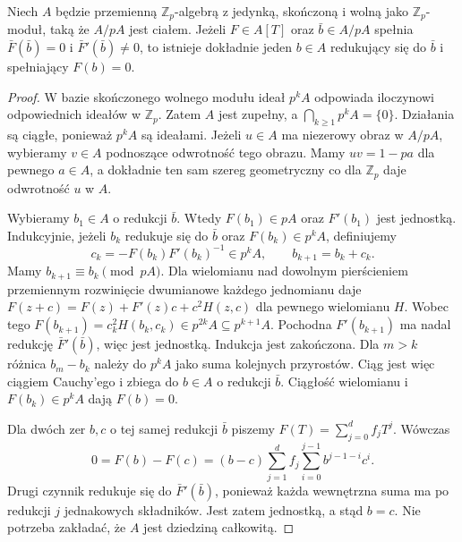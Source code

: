 \begin{lemat}
\label{aa:lem:hensel-simple}
Niech $A$ będzie przemienną $\mathbb Z_p$-algebrą z jedynką,
skończoną i wolną jako $\mathbb Z_p$-moduł, taką że $A/pA$
jest ciałem. Jeżeli $F\in A[T]$ oraz $\bar b\in A/pA$
spełnia $\bar F(\bar b)=0$ i $\bar F'(\bar b)\ne0$, to
istnieje dokładnie jeden $b\in A$ redukujący się do $\bar b$
i spełniający $F(b)=0$.
\end{lemat}
\begin{proof}
W bazie skończonego wolnego modułu ideał $p^kA$ odpowiada
iloczynowi odpowiednich ideałów w $\mathbb Z_p$.
Zatem $A$ jest zupełny, a $\bigcap_{k\ge1}p^kA=\{0\}$.
Działania są ciągłe, ponieważ $p^kA$ są ideałami.
Jeżeli $u\in A$ ma niezerowy obraz w $A/pA$, wybieramy
$v\in A$ podnoszące odwrotność tego obrazu. Mamy
$uv=1-pa$ dla pewnego $a\in A$, a dokładnie ten sam szereg
geometryczny co dla $\mathbb Z_p$ daje odwrotność $u$ w $A$.

Wybieramy $b_1\in A$ o redukcji $\bar b$. Wtedy
$F(b_1)\in pA$ oraz $F'(b_1)$ jest jednostką.
Indukcyjnie, jeżeli $b_k$ redukuje się do $\bar b$ oraz
$F(b_k)\in p^kA$, definiujemy
\[
 c_k=-F(b_k)F'(b_k)^{-1}\in p^kA,
 \qquad b_{k+1}=b_k+c_k.
\]
Mamy $b_{k+1}\equiv b_k\pmod{pA}$.
Dla wielomianu nad dowolnym pierścieniem przemiennym
rozwinięcie dwumianowe każdego jednomianu daje
$F(z+c)=F(z)+F'(z)c+c^2H(z,c)$ dla pewnego wielomianu $H$.
Wobec tego
$F(b_{k+1})=c_k^2H(b_k,c_k)\in p^{2k}A\subseteq p^{k+1}A$.
Pochodna $F'(b_{k+1})$ ma nadal redukcję $\bar F'(\bar b)$,
więc jest jednostką. Indukcja jest zakończona.
Dla $m>k$ różnica $b_m-b_k$ należy do $p^kA$ jako suma
kolejnych przyrostów. Ciąg jest więc ciągiem Cauchy'ego
i zbiega do $b\in A$ o redukcji $\bar b$.
Ciągłość wielomianu i $F(b_k)\in p^kA$ dają $F(b)=0$.

Dla dwóch zer $b,c$ o tej samej redukcji $\bar b$ piszemy
$F(T)=\sum_{j=0}^d f_jT^j$. Wówczas
\[
 0=F(b)-F(c)=(b-c)
 \sum_{j=1}^d f_j\sum_{i=0}^{j-1}b^{j-1-i}c^i.
\]
Drugi czynnik redukuje się do $\bar F'(\bar b)$, ponieważ
każda wewnętrzna suma ma po redukcji $j$ jednakowych składników.
Jest zatem jednostką, a stąd $b=c$. Nie potrzeba zakładać,
że $A$ jest dziedziną całkowitą.
\end{proof}

